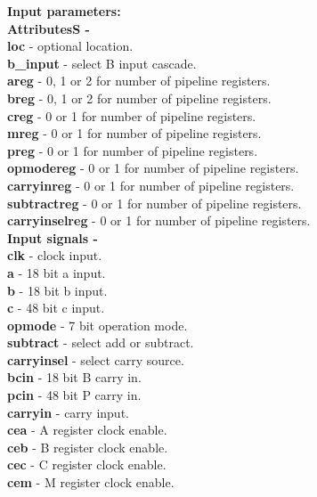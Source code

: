             {\bf Input parameters:} \\
            {\bf AttributesS -} \\
            {\bf loc} - optional location. \\
            {\bf b\_input} - select B input cascade. \\
            {\bf areg} - 0, 1 or 2 for number of pipeline registers. \\
            {\bf breg} - 0, 1 or 2 for number of pipeline registers. \\
            {\bf creg} - 0 or 1 for number of pipeline registers. \\
            {\bf mreg} - 0 or 1 for number of pipeline registers. \\
            {\bf preg} - 0 or 1 for number of pipeline registers. \\
            {\bf opmodereg} - 0 or 1 for number of pipeline registers. \\
            {\bf carryinreg} - 0 or 1 for number of pipeline registers. \\
            {\bf subtractreg} - 0 or 1 for number of pipeline registers. \\
            {\bf carryinselreg} - 0 or 1 for number of pipeline registers. \\
            {\bf Input signals -} \\
            {\bf clk} - clock input. \\
            {\bf a} - 18 bit a input.\\
            {\bf b} - 18 bit b input.\\
            {\bf c} - 48 bit c input.\\
            {\bf opmode} - 7 bit operation mode. \\
            {\bf subtract} - select add or subtract. \\
            {\bf carryinsel} - select carry source. \\
            {\bf bcin} - 18 bit B carry in. \\
            {\bf pcin} - 48 bit P carry in. \\
            {\bf carryin} - carry input. \\
            {\bf cea} - A register clock enable. \\
            {\bf ceb} - B register clock enable. \\
            {\bf cec} - C register clock enable. \\
            {\bf cem} - M register clock enable. \\
